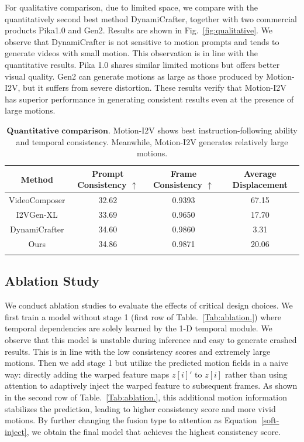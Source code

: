 \documentclass[10pt,twocolumn,letterpaper]{article}
\begin{document}
For qualitative comparison, due to limited space, we compare with the quantitatively second best method DynamiCrafter, together with two commercial products Pika1.0 and Gen2. Results are shown in Fig.~\ref{fig:qualitative}. We observe that DynamiCrafter is not sensitive to motion prompts and tends to generate videos with small motion. This observation is in line with the quantitative results. Pika 1.0 shares similar limited motions but offers better visual quality. Gen2 can generate motions as large as those produced by Motion-I2V, but it suffers from severe distortion. These results verify that Motion-I2V has superior performance in generating consistent results even at the presence of large motions.

\setlength{\tabcolsep}{1pt}
\begin{table}[h]
\centering
\scriptsize
\begin{tabular}{cccc}
\hline
Method & Prompt Consistency $\uparrow$ & Frame Consistency $\uparrow$ & Average Displacement\\

\hline
 VideoComposer & 32.62 & 0.9393 & 67.15 \\
 I2VGen-XL & 33.69 & 0.9650 & 17.70\\ 
 DynamiCrafter & 34.60 & 0.9860 & 3.31\\
 Ours & 34.86 & 0.9871 & 20.06 \\
 
\hline \\
\end{tabular}
\caption{\label{Tab:quantitative.} $\textbf{Quantitative comparison.}$ Motion-I2V shows best instruction-following ability and temporal consistency. Meanwhile, Motion-I2V generates relatively large motions.
}
\end{table}

\subsection{Ablation Study}

We conduct ablation studies to evaluate the effects of critical design choices. We first train a model without stage 1 (first row of Table.~\ref{Tab:ablation.}) where temporal dependencies are solely learned by the 1-D temporal module. We observe that this model is unstable during inference and easy to generate crashed results. This is in line with the low consistency scores and extremely large motions. Then we add stage 1 but utilize the predicted motion fields in a naive way: directly adding the warped feature maps $z[i]'$ to $z[i]$ rather than using attention to adaptively inject the warped feature to subsequent frames. As shown in the second row of Table.~\ref{Tab:ablation.}, this additional motion information stabilizes the prediction, leading to higher consistency score and more vivid motions. By further changing the fusion type to attention as Equation~\ref{soft-inject}, we obtain the final model that achieves the highest consistency score.
\end{document}
